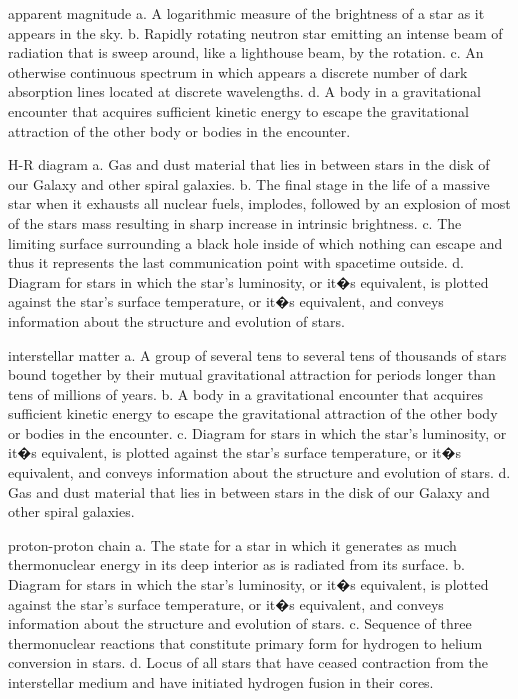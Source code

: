     apparent magnitude
    a. A logarithmic measure of the brightness of a star as it appears in the sky.
    b. Rapidly rotating neutron star emitting an intense beam of radiation that is sweep around, like a lighthouse beam, by the rotation.
    c. An otherwise continuous spectrum in which appears a discrete number of dark absorption lines located at discrete wavelengths.
    d. A body in a gravitational encounter that acquires sufficient kinetic energy to escape the gravitational attraction of the other body or bodies in the encounter.

    H-R diagram
    a. Gas and dust material that lies in between stars in the disk of our Galaxy and other spiral galaxies.
    b. The final stage in the life of a massive star when it exhausts all nuclear fuels, implodes, followed by an explosion of most of the stars mass resulting in sharp increase in intrinsic brightness.
    c. The limiting surface surrounding a black hole inside of which nothing can escape and thus it represents the last communication point with spacetime outside.
    d. Diagram for stars in which the star's luminosity, or it�s equivalent, is plotted against the star's surface temperature, or it�s equivalent, and conveys information about the structure and evolution of stars.

    interstellar matter
    a. A group of several tens to several tens of thousands of stars bound together by their mutual gravitational attraction for periods longer than tens of millions of years.
    b. A body in a gravitational encounter that acquires sufficient kinetic energy to escape the gravitational attraction of the other body or bodies in the encounter.
    c. Diagram for stars in which the star's luminosity, or it�s equivalent, is plotted against the star's surface temperature, or it�s equivalent, and conveys information about the structure and evolution of stars.
    d. Gas and dust material that lies in between stars in the disk of our Galaxy and other spiral galaxies.

    proton-proton chain
    a. The state for a star in which it generates as much thermonuclear energy in its deep interior as is radiated from its surface.
    b. Diagram for stars in which the star's luminosity, or it�s equivalent, is plotted against the star's surface temperature, or it�s equivalent, and conveys information about the structure and evolution of stars.
    c. Sequence of three thermonuclear reactions that constitute primary form for hydrogen to helium conversion in stars.
    d. Locus of all stars that have ceased contraction from the interstellar medium and have initiated hydrogen fusion in their cores.

